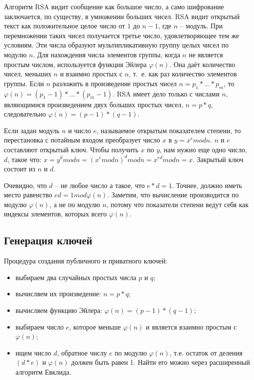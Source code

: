 Алгоритм RSA видит сообщение как большое число, а само шифрование заключается, по существу, в умножении больших чисел. RSA видит открытый текст как положительное целое число от $1$ до $n - 1$, где $n$ -- модуль. При перемножении таких чисел получается третье число, удовлетворяющее тем же условиям. Эти числа образуют мультипликативную группу целых чисел по модулю $n$. Для нахождения числа элементов группы, когда $n$ не является простым числом, используется функция Эйлера $\varphi(n)$. Она даёт количество чисел, меньших $n$ и взаимно простых с $n$, т.~е. как раз количество элементов группы. Если $n$ разложить в произведение простых чисел $n = p_1 * ... * p_m$, то $\varphi(n) = (p_1 - 1) * ... * (p_m - 1)$. RSA имеет дело только с числами $n$, являющимися произведением двух больших простых чисел, $n = p*q$, следовательно $\varphi(n) = (p - 1)*(q - 1)$.

Если задан модуль $n$ и число $e$, называемое открытым показателем степени, то перестановка с потайным входом преобразует число $x$ в $y = x^e mod n$. $n$ и $e$ составляют открытый ключ. Чтобы получить $x$ по $y$, нам нужно еще одно число, $d$, такое что: $x = y^d mod n = (x^e mod n)^d mod n = x^{ed} mod n = x$. Закрытый ключ состоит из $n$ и $d$.

Очевидно, что $d$ -- не любое число  а такое, что $e * d = 1$. Точнее, должно иметь место равенство $ed = 1 mod \varphi(n)$. Заметим, что вычисление производится по модулю $\varphi(n)$, а не по модулю $n$, потому что показатели степени ведут себя как индексы элементов, которых всего  $\varphi(n)$.

\subsection{Генерация ключей}

Процедура создания публичного и приватного ключей:

\begin{itemize}[label=---]
    \item выбираем два случайных простых числа $p$ и $q$;
    \item вычисляем их произведение: $n = p * q$;
    \item вычисляем функцию Эйлера: $\varphi(n) = (p-1) * (q-1)$;
    \item выбираем число $e$, которое меньше $\varphi(n)$ и является взаимно простым с $\varphi(n)$;
    \item ищем число $d$, обратное числу $e$ по модулю $\varphi(n)$, т.е. остаток от деления $(d*e)$ и $\varphi(n)$ должен быть равен 1. Найти его можно через расширенный алгоритм Евклида.
\end{itemize}

